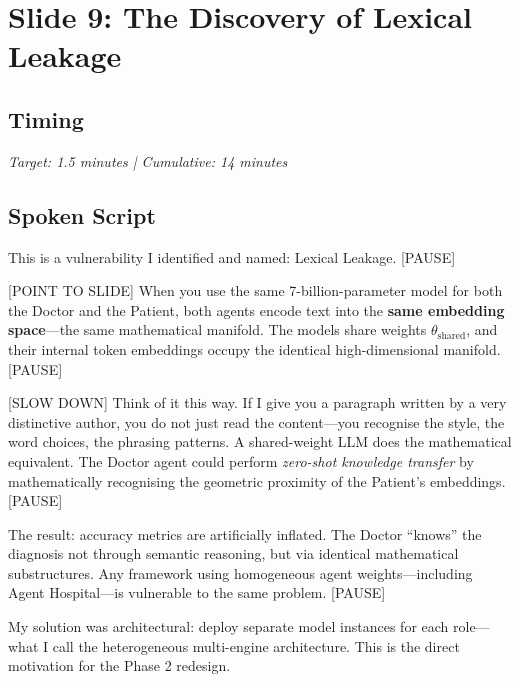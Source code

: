 \documentclass[12pt]{article}
\begin{document}
  \section{Slide 9: The Discovery of Lexical Leakage}

  \subsection*{Timing}
  \textit{Target: 1.5 minutes | Cumulative: 14 minutes}

  \subsection*{Spoken Script}
  \begin{spokenbox}
   This is a vulnerability I identified and named: Lexical Leakage. [PAUSE]

  [POINT TO SLIDE] When you use the same 7-billion-parameter model for both the Doctor and the Patient, both agents encode text into the \textbf{same embedding space}---the same mathematical manifold. The models share weights $\theta_{\text{shared}}$, and their internal token embeddings occupy the identical high-dimensional manifold. [PAUSE]

  [SLOW DOWN] Think of it this way. If I give you a paragraph written by a very distinctive author, you do not just read the content---you recognise the style, the word choices, the phrasing patterns. A shared-weight LLM does the mathematical equivalent. The Doctor agent could perform \textit{zero-shot knowledge transfer} by mathematically recognising the geometric proximity of the Patient's embeddings. [PAUSE]

  The result: accuracy metrics are artificially inflated. The Doctor ``knows'' the diagnosis not through semantic reasoning, but via identical mathematical substructures. Any framework using homogeneous agent weights---including Agent Hospital---is vulnerable to the same problem. [PAUSE]

  My solution was architectural: deploy separate model instances for each role---what I call the heterogeneous multi-engine architecture. This is the direct motivation for the Phase 2 redesign.
  \end{spokenbox}
\end{document}
